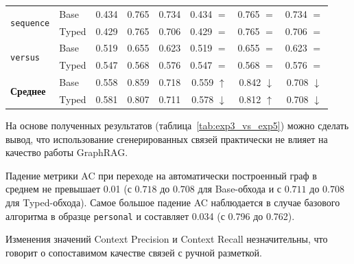 \begin{table}[H]
\begin{tabular}{llccc|ccc}
        \hline
        \multirow{2}{*}{\texttt{sequence}}  & Base                               & 0.434                                  & 0.765                                        & 0.734       & 0.434 $=$          & 0.765 $=$          & 0.734 $=$           \\
                                            & Typed                              & 0.429                                  & 0.765                                        & 0.706       & 0.429 $=$          & 0.765 $=$          & 0.706 $=$           \\
        \hline
        \multirow{2}{*}{\texttt{versus}}    & Base                               & 0.519                                  & 0.655                                        & 0.623       & 0.519 $=$          & 0.655 $=$          & 0.623 $=$           \\
                                            & Typed                              & 0.547                                  & 0.568                                        & 0.576       & 0.547 $=$          & 0.568 $=$          & 0.576 $=$           \\
        \hline
        \multirow{2}{*}{\textbf{Среднее}}   & Base                               & 0.558                                  & 0.859                                        & 0.718       & 0.559 $\uparrow$   & 0.842 $\downarrow$ & 0.708 $\downarrow$  \\
                                            & Typed                              & 0.581                                  & 0.807                                        & 0.711       & 0.578 $\downarrow$ & 0.812 $\uparrow$   & 0.708  $\downarrow$ \\
        \hline
    \end{tabular}
\end{table}


На основе полученных результатов (таблица~\ref{tab:exp3_vs_exp5})
можно сделать вывод, что использование сгенерированных связей
практически не влияет на качество работы GraphRAG.

Падение метрики AC при переходе на автоматически построенный граф
в среднем не превышает 0.01
(с $0.718$ до $0.708$ для Base-обхода и с $0.711$ до $0.708$ для Typed-обхода).
Самое большое падение AC наблюдается в случае базового алгоритма
в образце \texttt{personal} и составляет 0.034 (с 0.796 до 0.762).

Изменения значений Context Precision и Context Recall
незначительны, что говорит о сопоставимом качестве связей
с ручной разметкой.


